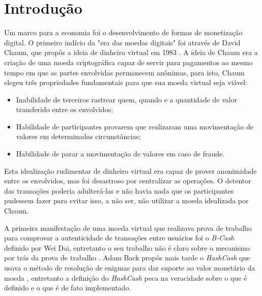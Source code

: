 \documentclass[tcc,capa]{texufpel}
\begin{document}
\tableofcontents

\chapter{Introdução}\label{chap:introducao}

    

    Um marco para a economia foi o desenvolvimento de formas de monetização digital. O primeiro indício da "era das moedas digitais" foi através de David Chaum, que propôs a ideia de dinheiro virtual em 1983 \cite{chaum1983blind}. A ideia de Chaum era a criação de uma moeda criptográfica capaz de servir para pagamentos ao mesmo tempo em que as partes envolvidas permanecem anônimas, para isto, Chaum elegeu três propriedades fundamentais para que sua moeda virtual seja viável: 
	
	\begin{itemize}
	    \item Inabilidade de terceiros rastrear quem, quando e a quantidade de valor transferido entre os envolvidos;
	    \item Habilidade de participantes provarem que realizaram uma movimentação de valores em determinadas circunstâncias;
	    \item Habilidade de parar a movimentação de valores em caso de fraude.
	\end{itemize}
	
	Esta idealização rudimentar de dinheiro virtual era capaz de prover anonimidade entre os envolvidos, mas foi desastroso por centralizar as operações. O detentor das transações poderia adulterá-las e não havia nada que os participantes pudessem fazer para evitar isso, a não ser, não utilizar a moeda idealizada por Chaum.
	
	A primeira manifestação de uma moeda virtual que realizava prova de trabalho para comprovar a autenticidade de transações entre usuários foi o \textit{B-Cash} definido por Wei Dai, entretanto o seu trabalho não é claro sobre o mecanismo por trás da prova de trabalho \cite{buterin2014next}. Adam Back propôs mais tarde o \textit{HashCash} que usava o método de resolução de enigmas para dar suporte ao valor monetário da moeda \cite{back2002hashcash}, entretanto a definição do \textit{HashCash} peca na veracidade sobre o que é definido e o que é de fato implementado.
	
\end{document}
